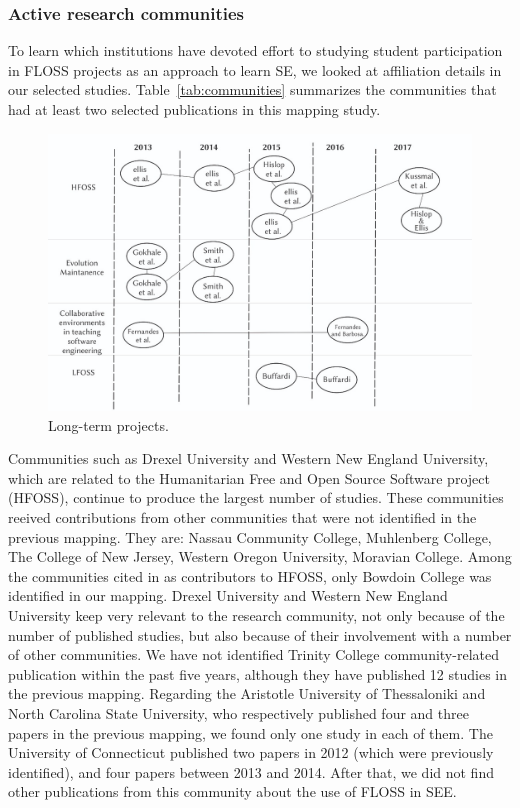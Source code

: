 \subsubsection{Active research communities}

To learn which institutions have devoted effort to studying student participation in FLOSS projects as an approach to learn SE, we looked at affiliation details in our selected studies.
Table~\ref{tab:communities} summarizes the communities that had at least two selected  publications in this mapping study. 



\begin{figure}[ht]
\includegraphics[width=.8\linewidth]{fig/long_term.jpeg}
\caption{Long-term projects.} \label{fig:longterms}
\end{figure}

Communities such as Drexel University and Western New England University, 
which are related to the Humanitarian Free and Open Source Software project (HFOSS), continue to produce the largest number of studies. These communities reeived contributions from other communities that were not identified in the previous mapping. 
They are: 
Nassau Community College, Muhlenberg College, The College of New Jersey, Western Oregon University, Moravian College. 
Among the communities cited in \citeauthor{2015:CSE:nascimento} as contributors to HFOSS, only Bowdoin College was identified in our mapping. 
Drexel University and Western New England University keep very relevant 
to the research community, not only because of the number of published studies, 
but also because of their involvement with a number of other communities. 
We have not identified Trinity College community-related publication within the past five years, although they have published 12 studies in the previous mapping. 
Regarding the Aristotle University of Thessaloniki and North Carolina State University, 
who respectively published four and three papers in the previous mapping, 
we found only one study in each of them.
The University of Connecticut published two papers in 2012 
(which were previously identified), 
and four papers between 2013 and 2014. 
After that, we did not find other publications from this community 
about the use of FLOSS in SEE.

